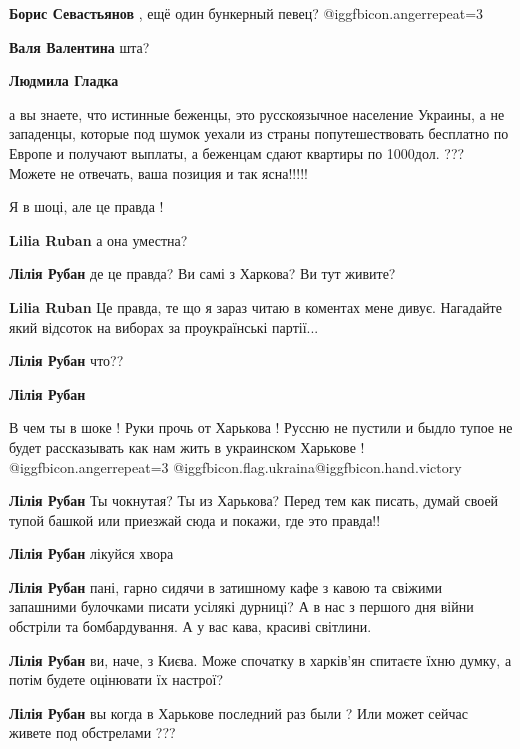 \begin{itemize}
\begin{itemize}
\textbf{Борис Севастьянов} , ещё один бункерный певец? @igg{fbicon.anger}{repeat=3} 

\textbf{Валя Валентина} шта?

\textbf{Людмила Гладка} 

а вы знаете, что истинные беженцы, это русскоязычное население Украины, а не
западенцы, которые под шумок уехали из страны попутешествовать бесплатно по
Европе и получают выплаты, а беженцам сдают квартиры по 1000дол. ??? Можете не
отвечать, ваша позиция и так ясна!!!!!

\end{itemize} %

Я в шоці, але це правда !

\begin{itemize} %
\textbf{Lilia Ruban} а она уместна?

\textbf{Лілія Рубан} де це правда? Ви самі з Харкова? Ви тут живите?

\textbf{Lilia Ruban} Це правда, те що я зараз читаю в коментах мене дивує. Нагадайте який відсоток на виборах за проукраїнські партії...

\textbf{Лілія Рубан} что??

\textbf{Лілія Рубан} 

В чем ты в шоке ! Руки прочь от Харькова ! Руссню не пустили и быдло тупое не
будет рассказывать как нам жить в украинском Харькове ! @igg{fbicon.anger}{repeat=3} @igg{fbicon.flag.ukraina}@igg{fbicon.hand.victory}

\textbf{Лілія Рубан} Ты чокнутая? Ты из Харькова? Перед тем как писать, думай своей тупой башкой или приезжай сюда и покажи, где это правда!!

\textbf{Лілія Рубан} лікуйся хвора

\textbf{Лілія Рубан} пані, гарно сидячи в затишному кафе з кавою та свіжими запашними булочками писати усілякі дурниці? А в нас з першого дня війни обстріли та бомбардування. А у вас кава, красиві світлини.

\textbf{Лілія Рубан} ви, наче, з Києва. Може спочатку в харків'ян спитаєте їхню думку, а потім будете оцінювати їх настрої?

\textbf{Лілія Рубан} вы когда в Харькове последний раз были ?
Или может сейчас живете под обстрелами ???


\end{itemize}
\end{itemize}
